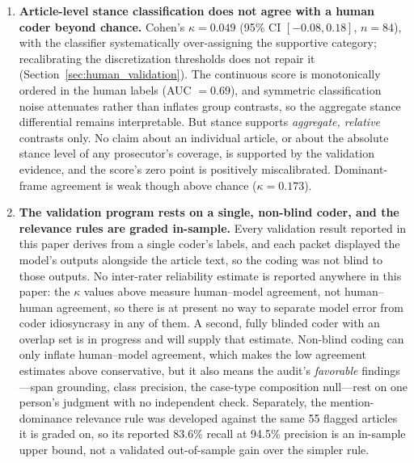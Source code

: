 \documentclass[12pt, letterpaper]{article}
\begin{document}
\begin{enumerate}[leftmargin=*, itemsep=6pt]
\item \textbf{Article-level stance classification does not agree with a human coder beyond chance.} Cohen's $\kappa = 0.049$ (95\% CI $[-0.08, 0.18]$, $n = 84$), with the classifier systematically over-assigning the supportive category; recalibrating the discretization thresholds does not repair it (Section~\ref{sec:human_validation}). The continuous score is monotonically ordered in the human labels (AUC $= 0.69$), and symmetric classification noise attenuates rather than inflates group contrasts, so the aggregate stance differential remains interpretable. But stance supports \emph{aggregate, relative} contrasts only. No claim about an individual article, or about the absolute stance level of any prosecutor's coverage, is supported by the validation evidence, and the score's zero point is positively miscalibrated. Dominant-frame agreement is weak though above chance ($\kappa = 0.173$).

\item \textbf{The validation program rests on a single, non-blind coder, and the relevance rules are graded in-sample.} Every validation result reported in this paper derives from a single coder's labels, and each packet displayed the model's outputs alongside the article text, so the coding was not blind to those outputs. No inter-rater reliability estimate is reported anywhere in this paper: the $\kappa$ values above measure human--model agreement, not human--human agreement, so there is at present no way to separate model error from coder idiosyncrasy in any of them. A second, fully blinded coder with an overlap set is in progress and will supply that estimate. Non-blind coding can only inflate human--model agreement, which makes the low agreement estimates above conservative, but it also means the audit's \emph{favorable} findings---span grounding, class precision, the case-type composition null---rest on one person's judgment with no independent check. Separately, the mention-dominance relevance rule was developed against the same 55 flagged articles it is graded on, so its reported 83.6\% recall at 94.5\% precision is an in-sample upper bound, not a validated out-of-sample gain over the simpler rule.


\end{enumerate}
\end{document}
